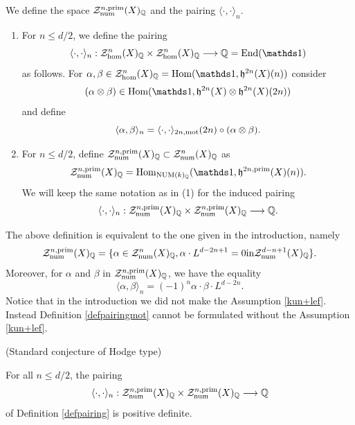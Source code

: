 \begin{definition}
\notready\label{defpairing} We define  the space $\mathcal{Z}^{n,\mathrm{prim}}_{\mathrm{num}}(X)_{\mathbb{Q}} $  and the  pairing  $\langle \cdot, \cdot \rangle_{n}$.
\begin{enumerate}
\item For $n \leq d/2$, we  define the pairing
 \[\langle \cdot, \cdot \rangle_{n} : \mathcal{Z}^{n}_{\hom}(X)_{\Q}  \times  \mathcal{Z}^{n}_{\hom}(X)_{\Q}  \longrightarrow \Q=\End(\one)\]
as follows. For $\alpha, \beta  \in \mathcal{Z}^{n}_{\hom}(X)_{\Q}  = \Hom (\one, \mathfrak{h}^{2n}(X)(n))$ consider
\[(\alpha \otimes \beta)  \in   \Hom (\one, \mathfrak{h}^{2n}(X) \otimes \mathfrak{h}^{2n}(X)(2n))\] and define
\[\langle \alpha, \beta \rangle_{n} =      \langle \cdot, \cdot \rangle_{2n,\mathrm{mot}} (2n) \circ  (\alpha \otimes \beta).\]

\item For $n \leq d/2$, define  $\mathcal{Z}^{n,\mathrm{prim}}_{\mathrm{num}}(X)_{\mathbb{Q}} \subset \mathcal{Z}^{n}_{\mathrm{num}}(X)_{\mathbb{Q}}$ as
 \[\mathcal{Z}^{n,\prim}_{\num}(X)_{\Q}  = \Hom_{\NUM(k)_\Q}(\one, \mathfrak{h}^{2n,\prim}(X)(n)).\]  We will keep the same notation as in (1) for the induced pairing
 \[\langle \cdot, \cdot \rangle_{n} : \mathcal{Z}^{n,\mathrm{prim}}_{\mathrm{num}}(X)_{\mathbb{Q}}  \times  \mathcal{Z}^{n,\mathrm{prim}}_{\mathrm{num}}(X)_{\mathbb{Q}}  \longrightarrow \mathbb{Q}.\]
\end{enumerate}
 \end{definition}
 \begin{remark}
\notready
The  above definition is equivalent to the one given in the introduction, namely
\[\mathcal{Z}^{n,\mathrm{prim}}_{\mathrm{num}}(X)_{\mathbb{Q}} = \{\alpha \in \mathcal{Z}^{n}_{\mathrm{num}}(X)_{\mathbb{Q}} ,  \alpha \cdot L^ {{d-2n+1}}=0   \textrm{in}    \mathcal{Z}^{d-n+1}_{\mathrm{num}}(X)_{\mathbb{Q}}\}.\]
Moreover,  for $\alpha$ and $\beta$ in $\mathcal{Z}^{n,\mathrm{prim}}_{\mathrm{num}}(X)_{\mathbb{Q}}$,  we have the equality \[\langle \alpha, \beta \rangle_{n} =  (-1)^n \alpha \cdot \beta \cdot L^{d-2n}.\]
 Notice that in the introduction we
 did not make the Assumption \ref{kun+lef}. Instead Definition \ref{defpairingmot} cannot be formulated without the  Assumption \ref{kun+lef}.
\end{remark}
\begin{conj}
\notready\label{conjscht} (Standard conjecture of Hodge type)

 For all $n \leq d/2$, the pairing  \[\langle \cdot, \cdot \rangle_{n} : \mathcal{Z}^{n,\mathrm{prim}}_{\mathrm{num}}(X)_{\mathbb{Q}}  \times  \mathcal{Z}^{n,\mathrm{prim}}_{\mathrm{num}}(X)_{\mathbb{Q}}  \longrightarrow \mathbb{Q}\]
of Definition \ref{defpairing} is positive definite.
\end{conj}


